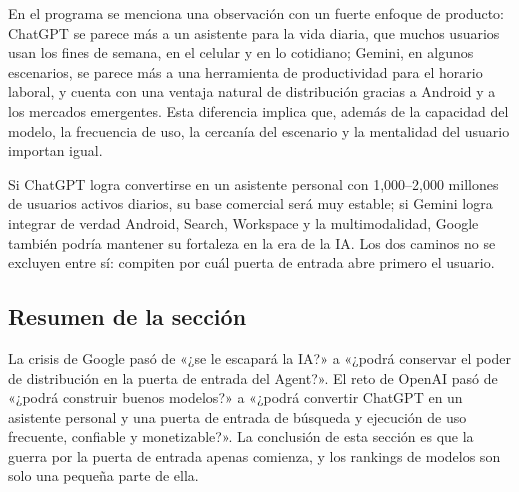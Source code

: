 En el programa se menciona una observación con un fuerte enfoque de producto: ChatGPT se parece más a un asistente para la vida diaria, que muchos usuarios usan los fines de semana, en el celular y en lo cotidiano; Gemini, en algunos escenarios, se parece más a una herramienta de productividad para el horario laboral, y cuenta con una ventaja natural de distribución gracias a Android y a los mercados emergentes. Esta diferencia implica que, además de la capacidad del modelo, la frecuencia de uso, la cercanía del escenario y la mentalidad del usuario importan igual.

Si ChatGPT logra convertirse en un asistente personal con 1,000--2,000 millones de usuarios activos diarios, su base comercial será muy estable; si Gemini logra integrar de verdad Android, Search, Workspace y la multimodalidad, Google también podría mantener su fortaleza en la era de la IA. Los dos caminos no se excluyen entre sí: compiten por cuál puerta de entrada abre primero el usuario.

\subsection{Resumen de la sección}

La crisis de Google pasó de «¿se le escapará la IA?» a «¿podrá conservar el poder de distribución en la puerta de entrada del Agent?». El reto de OpenAI pasó de «¿podrá construir buenos modelos?» a «¿podrá convertir ChatGPT en un asistente personal y una puerta de entrada de búsqueda y ejecución de uso frecuente, confiable y monetizable?». La conclusión de esta sección es que la guerra por la puerta de entrada apenas comienza, y los rankings de modelos son solo una pequeña parte de ella.
